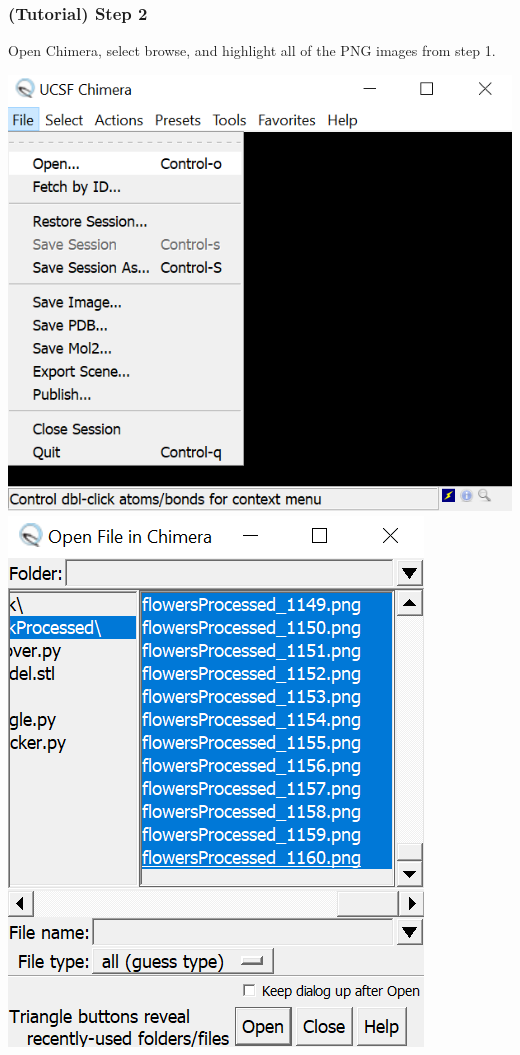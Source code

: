 \documentclass[12 pt]{article}
\begin{document}
\subsubsection*{(Tutorial) Step 2}
Open Chimera, select browse, and highlight all of the PNG images from step 1.
\begin{center}
    \includegraphics[width = .35\paperwidth]{images/Chimera_File.png}\hspace{20pt}\includegraphics[width=.25\paperwidth]{images/Chimera_Import.PNG}
\end{center}
\end{document}
